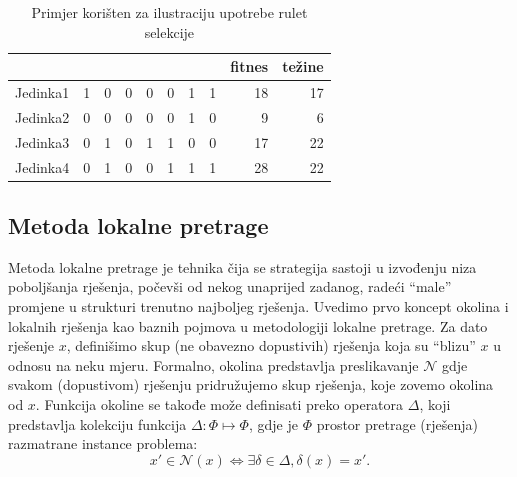 \documentclass[a4paper, utf8, 11pt, colorlinks]{book}
\theoremstyle{definition}
\begin{document}
\begin{table}
	\centering
	\begin{tabular}{l|rrrrrrrrr}
		& \multicolumn{1}{l}{} & \multicolumn{1}{l}{} & \multicolumn{1}{l}{} & \multicolumn{1}{l}{} & \multicolumn{1}{l}{} & \multicolumn{1}{l}{} & \multicolumn{1}{l}{} & \multicolumn{1}{l}{fitnes} & \multicolumn{1}{l}{težine}  \\\hline
		Jedinka1 & 1                    & 0                    & 0                    & 0                    & 0                    & 1                    & 1                    & 18                         & 17                          \\
		Jedinka2 & 0                    & 0                    & 0                    & 0                    & 0                    & 1                    & 0                    & 9                          & 6                           \\
		Jedinka3 & 0                    & 1                    & 0                    & 1                    & 1                    & 0                    & 0                    & 17                         & 22                          \\
		Jedinka4 & 0                    & 1                    & 0                    & 0                    & 1                    & 1                    & 1                    & 28                         & 22      \\\hline                   
	\end{tabular}\caption{Primjer korišten za ilustraciju upotrebe rulet selekcije}
	\label{tab:rulet}
\end{table}
 
\subsection{Metoda lokalne pretrage}\label{sec: local_search}

Metoda lokalne pretrage je tehnika čija se strategija sastoji u izvođenju niza poboljšanja  rješenja, počevši od nekog unaprijed zadanog, radeći ``male'' promjene u strukturi trenutno najboljeg rješenja. Uvedimo prvo koncept okolina i lokalnih rješenja kao baznih pojmova u metodologiji lokalne pretrage. Za dato rješenje $x$, definišimo skup (ne obavezno dopustivih) rješenja koja su ``blizu'' $x$ u odnosu na neku mjeru. Formalno, okolina predstavlja preslikavanje  $\mathcal{N}$ gdje svakom (dopustivom) rješenju pridružujemo skup rješenja, koje zovemo okolina od $x$.  Funkcija okoline se takođe može definisati preko operatora  $\Delta$, koji predstavlja kolekciju   funkcija $\Delta:\Phi \mapsto \Phi$,  gdje je $\Phi$ prostor pretrage (rješenja) razmatrane instance problema:
$$ x' \in \mathcal{N}(x) \Longleftrightarrow \exists \delta \in \Delta,\delta(x)=x'.$$
 
\end{document}
